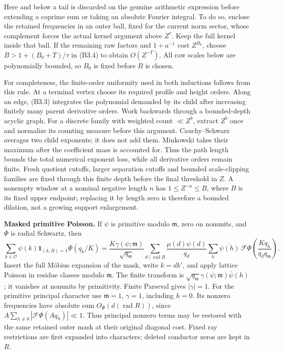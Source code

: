 \documentclass[11pt,a4paper]{article}
\begin{document}
Here and below a tail is discarded on the genuine arithmetic expression
before extending a coprime sum or taking an absolute Fourier integral.
To do so, enclose the retained frequencies in an outer ball, fixed for
the current norm sector, whose complement forces the actual kernel
argument above \(Z^\tau\). Keep the full kernel inside that ball. If the
remaining raw factors and \(1+a^{-1}\) cost \(Z^{B_0}\), choose
\(B>1+(B_0+T)/\tau\) in (B3.4) to obtain \(O(Z^{-T})\). All raw scales
below are polynomially bounded, so \(B_0\) is fixed before \(B\) is
chosen.

For completeness, the finite-order uniformity used in both inductions
follows from this rule. At a terminal vertex choose its required profile
and height orders. Along an edge, (B3.3) integrates the polynomial
demanded by its child after increasing finitely many parent derivative
orders. Work backwards through a bounded-depth acyclic graph. For a
discrete family with weighted count \(\ll Z^b\), extract \(Z^b\) once
and normalize its counting measure before this argument. Cauchy--Schwarz
averages two child exponents; it does not add them. Minkowski takes
their maximum after the coefficient mass is accounted for. Thus the path
length bounds the total numerical exponent loss, while all derivative
orders remain finite. Fresh quotient cutoffs, larger separation cutoffs
and bounded scale-clipping families are fixed through this finite depth
before the final threshold in \(Z\). A nonempty window at a nominal
negative length \(n\) has \(1\le Z^{-n}\le B\), where \(B\) is its fixed
upper endpoint; replacing it by length zero is therefore a bounded
dilation, not a growing support enlargement.

\textbf{Masked primitive Poisson.} If \(\psi\) is primitive modulo
\(\mathfrak m\), zero on nonunits, and \(\Phi\) is radial Schwartz, then
\[
\sum_{k\in\mathcal O}\psi(k)\mathbf1_{(k,R)=1}\Phi(q_k/K)
=\frac{K\gamma(\psi;\mathfrak m)}{\sqrt{q_{\mathfrak m}}}
 \sum_{d\mid\operatorname{rad}R}\frac{\mu(d)\psi(d)}{q_d}
 \sum_h\overline{\psi(h)}\,\mathcal F\Phi
       \left(\frac{Kq_h}{q_dq_{\mathfrak m}}\right).
\tag{B3.5}
\] Insert the full Möbius expansion of the mask, write \(k=dk'\), and
apply lattice Poisson in residue classes modulo \(\mathfrak m\). The
finite transform is
\(\sqrt{q_{\mathfrak m}}\gamma(\psi;\mathfrak m)\overline\psi(h)\); it
vanishes at nonunits by primitivity. Finite Parseval gives
\(|\gamma|=1\). For the primitive principal character use
\(\mathfrak m=1\), \(\gamma=1\), including \(h=0\). Its nonzero
frequencies have absolute sum \(O_\Phi(d(\operatorname{rad}R))\), since
\(A\sum_{h\ne0}|\mathcal F\Phi(Aq_h)|\ll1\). Thus principal nonzero
terms may be restored with the same retained outer mask at their
original diagonal cost. Fixed ray restrictions are first expanded into
characters; deleted conductor zeros are kept in \(R\).
\end{document}
